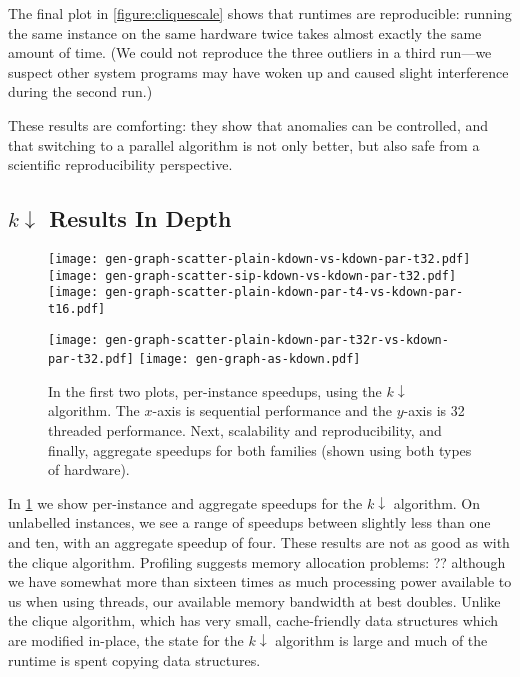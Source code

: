 \documentclass{llncs}
\begin{document}
The final plot in \cref{figure:cliquescale} shows that runtimes are reproducible: running the same
instance on the same hardware twice takes almost exactly the same amount of time. (We could not
reproduce the three outliers in a third run---we suspect other system programs may have woken up
and caused slight interference during the second run.)

These results are comforting: they show that anomalies can be controlled, and that
switching to a parallel algorithm is not only better, but also safe from a scientific
reproducibility perspective.

\subsection{$k{\downarrow}$ Results In Depth}

\begin{figure}[tb]
    \texttt{[image: gen-graph-scatter-plain-kdown-vs-kdown-par-t32.pdf]}
    \hfill
    \texttt{[image: gen-graph-scatter-sip-kdown-vs-kdown-par-t32.pdf]}
    \hfill
    \texttt{[image: gen-graph-scatter-plain-kdown-par-t4-vs-kdown-par-t16.pdf]}

    \vspace*{1em}

    \texttt{[image: gen-graph-scatter-plain-kdown-par-t32r-vs-kdown-par-t32.pdf]}
    \hfill
    \texttt{[image: gen-graph-as-kdown.pdf]}

    \caption{In the first two plots, per-instance speedups, using the $k{\downarrow}$ algorithm. The
    $x$-axis is sequential performance and the $y$-axis is 32 threaded performance. Next,
    scalability and reproducibility, and finally, aggregate speedups for both
    families (shown using both types of hardware).}\label{figure:kdownscatters}
\end{figure}

In \cref{figure:kdownscatters} we show per-instance and aggregate speedups for the $k{\downarrow}$
algorithm. On unlabelled instances, we see a range of speedups between slightly less than one and
ten, with an aggregate speedup of four. These results are not as good as with the clique algorithm.
Profiling suggests memory allocation problems: ?? although we have somewhat more than
sixteen times as much processing power available to us when using threads, our available memory
bandwidth at best doubles. Unlike the clique algorithm, which has very
small, cache-friendly data structures which are modified in-place, the state for the $k{\downarrow}$
algorithm is large and much of the runtime is spent copying data structures.
\end{document}
